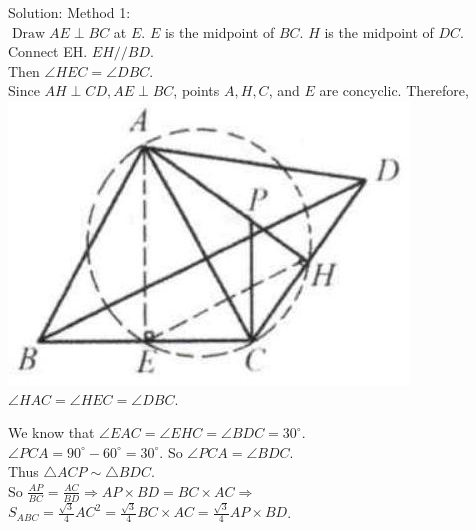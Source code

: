 \documentclass[10pt]{article}
\begin{document}
Solution:
Method 1:\\
\(\operatorname{Draw} A E \perp B C\) at \(E\). \(E\) is the midpoint of \(B C\). \(H\) is the midpoint of \(D C\).\\
Connect EH. \(E H / / B D\).\\
Then \(\angle H E C=\angle D B C\).\\
Since \(A H \perp C D, A E \perp B C\), points \(A, H, C\), and \(E\) are concyclic. Therefore,\\
\includegraphics[max width=\textwidth, center]{2025_04_17_97bc1f7e44d93c271a88g-197(2)}\\
\(\angle H A C=\angle H E C=\angle D B C\).


We know that \(\angle E A C=\angle E H C=\angle B D C=30^{\circ}\).\\
\(\angle P C A=90^{\circ}-60^{\circ}=30^{\circ}\). So \(\angle P C A=\angle B D C\).\\
Thus \(\triangle A C P \sim \triangle B D C\).\\
So \(\frac{A P}{B C}=\frac{A C}{B D} \Rightarrow A P \times B D=B C \times A C \Rightarrow\) \(S_{A B C}=\frac{\sqrt{3}}{4} A C^{2}=\frac{\sqrt{3}}{4} B C \times A C=\frac{\sqrt{3}}{4} A P \times B D\).
\end{document}
